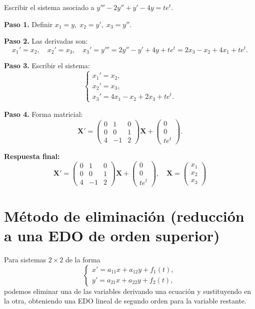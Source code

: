 \begin{example}
Escribir el sistema asociado a $y'''-2y''+y'-4y=t e^t$.
\begin{myproof}
\textbf{Paso 1.} Definir $x_1=y,\; x_2=y',\; x_3=y''$.

\textbf{Paso 2.} Las derivadas son:
\[
x_1'=x_2,\quad x_2'=x_3,\quad x_3'=y'''=2y''-y'+4y+t e^t=2x_3-x_2+4x_1+t e^t.
\]

\textbf{Paso 3.} Escribir el sistema:
\[
\begin{cases}
x_1'=x_2,\\
x_2'=x_3,\\
x_3'=4x_1-x_2+2x_3+t e^t.
\end{cases}
\]

\textbf{Paso 4.} Forma matricial:
\[
\mathbf{X}'=
\begin{pmatrix}
0&1&0\\
0&0&1\\
4&-1&2
\end{pmatrix}
\mathbf{X}
+
\begin{pmatrix}
0\\0\\t e^t
\end{pmatrix}.
\]

\textbf{Respuesta final:}
\[
\boxed{
\mathbf{X}'=
\begin{pmatrix}
0&1&0\\
0&0&1\\
4&-1&2
\end{pmatrix}
\mathbf{X}
+
\begin{pmatrix}
0\\0\\t e^t
\end{pmatrix},\quad
\mathbf{X}=
\begin{pmatrix}
x_1\\x_2\\x_3
\end{pmatrix}
}
\]
\end{myproof}
\end{example}

\section{Método de eliminación (reducción a una EDO de orden superior)}

Para sistemas $2\times2$ de la forma
\[
\begin{cases}
x' = a_{11}x + a_{12}y + f_1(t),\\
y' = a_{21}x + a_{22}y + f_2(t),
\end{cases}
\]
podemos eliminar una de las variables derivando una ecuación y sustituyendo en la otra, obteniendo una EDO lineal de segundo orden para la variable restante.

